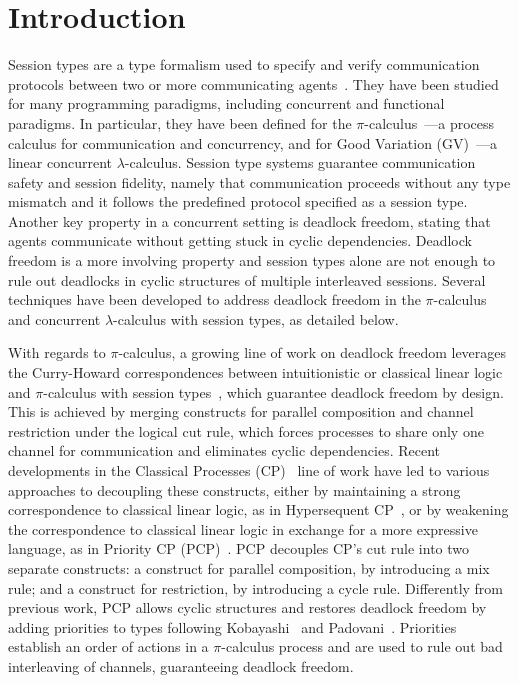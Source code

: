 \documentclass[main.tex]{subfiles}
\begin{document}
\section{Introduction}
Session types are a type formalism used to specify and verify communication protocols between two or more communicating agents~\cite{honda93,takeuchihonda94,hondavasconcelos98,carbonehonda07}.
They have been studied for many programming paradigms, including concurrent and functional paradigms. In particular, they have been defined for the $\pi$-calculus~\cite{sangiorgiwalker01}---a process calculus for communication and concurrency, and for Good Variation (GV)~\cite{wadler14,lindleymorris15}---a linear concurrent $\lambda$-calculus.
Session type systems guarantee communication safety and session fidelity, namely that communication proceeds without any type mismatch and it follows the predefined protocol specified as a session type.
Another key property in a concurrent setting is deadlock freedom, stating that agents communicate without getting stuck in cyclic dependencies. Deadlock freedom is a more involving property and session types alone are not enough to rule out deadlocks in cyclic structures of multiple interleaved sessions. Several techniques have been developed to address deadlock freedom in the $\pi$-calculus and concurrent $\lambda$-calculus with session types, as detailed below.

With regards to $\pi$-calculus, a growing line of work on deadlock freedom leverages the Curry-Howard correspondences between intuitionistic or classical linear logic and $\pi$-calculus with session types~\cite{cairespfenning10,wadler14}, which guarantee deadlock freedom by design. This is achieved by merging constructs for parallel composition and channel restriction under the logical cut rule, which forces processes to share only one channel for communication and eliminates cyclic dependencies. Recent developments in the Classical Processes (CP)~\cite{wadler14} line of work have led to various approaches to decoupling these constructs, either by maintaining a strong correspondence to classical linear logic, as in Hypersequent CP~\cite{kokkemontesi19popl,kokkemontesi19tlla}, or by weakening the correspondence to classical linear logic in exchange for a more expressive language, as in Priority CP (PCP)~\cite{dardhagay18}. PCP decouples CP's cut rule into two separate constructs: a construct for parallel composition, by introducing a mix rule; and a construct for restriction, by introducing a cycle rule. Differently from previous work, PCP allows cyclic structures and restores deadlock freedom by adding priorities to types following Kobayashi~\cite{kobayashi06} and Padovani~\cite{padovani14}. Priorities establish an order of actions in a $\pi$-calculus process and are used to rule out bad interleaving of channels, guaranteeing deadlock freedom.
\end{document}
